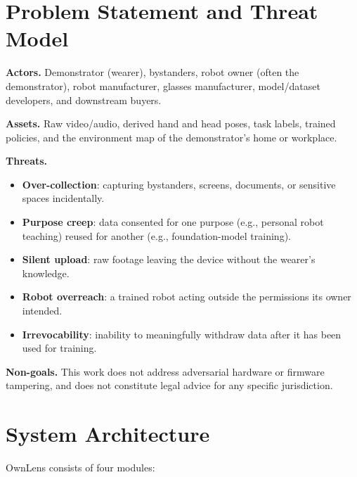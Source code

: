 \documentclass[10pt,twocolumn,letterpaper]{article}
\begin{document}
\section{Problem Statement and Threat Model}

\textbf{Actors.} Demonstrator (wearer), bystanders, robot owner (often the demonstrator), robot manufacturer, glasses manufacturer, model/dataset developers, and downstream buyers.

\textbf{Assets.} Raw video/audio, derived hand and head poses, task labels, trained policies, and the environment map of the demonstrator's home or workplace.

\textbf{Threats.}
\begin{itemize}
  \item \textbf{Over-collection}: capturing bystanders, screens, documents, or sensitive spaces incidentally.
  \item \textbf{Purpose creep}: data consented for one purpose (e.g., personal robot teaching) reused for another (e.g., foundation-model training).
  \item \textbf{Silent upload}: raw footage leaving the device without the wearer's knowledge.
  \item \textbf{Robot overreach}: a trained robot acting outside the permissions its owner intended.
  \item \textbf{Irrevocability}: inability to meaningfully withdraw data after it has been used for training.
\end{itemize}

\textbf{Non-goals.} This work does not address adversarial hardware or firmware tampering, and does not constitute legal advice for any specific jurisdiction.

\section{System Architecture}

OwnLens consists of four modules:
\end{document}
